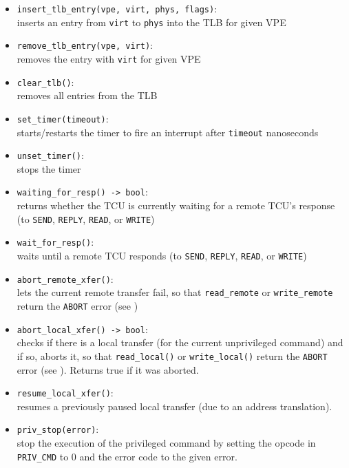 \begin{itemize}
  \item \texttt{insert\_tlb\_entry(vpe, virt, phys, flags)}: \\
  inserts an entry from \texttt{virt} to \texttt{phys} into the TLB for given VPE
  \item \texttt{remove\_tlb\_entry(vpe, virt)}:\\
  removes the entry with \texttt{virt} for given VPE
  \item \texttt{clear\_tlb()}:\\
  removes all entries from the TLB \extend{}
  \item \texttt{set\_timer(timeout)}: \\
  starts/restarts the timer to fire an interrupt after \texttt{timeout} nanoseconds
  \item \texttt{unset\_timer()}:\\
  stops the timer
  \item \texttt{waiting\_for\_resp() -> bool}:\\
  returns whether the TCU is currently waiting for a remote TCU's response (to \texttt{SEND},
  \texttt{REPLY}, \texttt{READ}, or \texttt{WRITE})
  \item \texttt{wait\_for\_resp()}:\\
  waits until a remote TCU responds (to \texttt{SEND}, \texttt{REPLY}, \texttt{READ}, or
  \texttt{WRITE})
  \item \texttt{abort\_remote\_xfer()}:\\
  lets the current remote transfer fail, so that \texttt{read\_remote} or \texttt{write\_remote}
  return the \texttt{ABORT} error (see )
  \item \texttt{abort\_local\_xfer() -> bool}:\\
  checks if there is a local transfer (for the current unprivileged command) and if so, aborts it,
  so that \texttt{read\_local()} or \texttt{write\_local()} return the \texttt{ABORT} error (see
  ). Returns true if it was aborted.
  \item \texttt{resume\_local\_xfer()}:\\
  resumes a previously paused local transfer (due to an address translation). \extend{}
  \item \texttt{priv\_stop(error)}: \\
  stop the execution of the privileged command by setting the opcode in \texttt{PRIV\_CMD} to 0 and
  the error code to the given error. \extend{}
\end{itemize}

